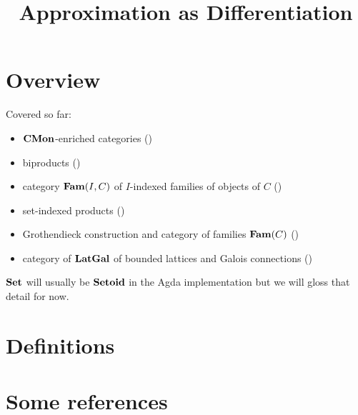 \documentclass[acmsmall,nonacm]{acmart}
\begin{document}
\title{Approximation as Differentiation}
\maketitle

\section{Overview}

Covered so far:
\begin{itemize}
\item $\mathbf{CMon}$-enriched categories ()
\item biproducts ()
\item category $\mathbf{Fam}(I,C)$ of $I$-indexed families of objects of $C$ ()
\item set-indexed products ()
\item Grothendieck construction and category of families $\mathbf{Fam}(C)$ ()
\item category of $\mathbf{LatGal}$ of bounded lattices and Galois connections ()
\end{itemize}

\noindent $\mathbf{Set}$ will usually be $\mathbf{Setoid}$ in the Agda implementation but we will gloss that detail for now.



\section{Definitions}








% 

\section{Some references}

\cite{karvonen2020}



\end{document}
